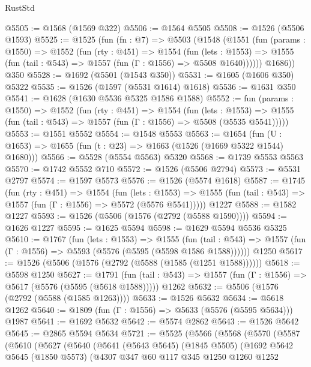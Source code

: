 \begin{lexlean}{RustStd}
\begin{coremodule}
@5505 := @1568 (@1569 @322)
@5506 := @1564 @5505
@5508 := @1526 (@5506 @1593)
@5525 := @1525
    (fun (fn : @7) =>
    @5503
      (@1548
        (@1551
          (fun (params : @1550) =>
          @1552
            (fun (rty : @451) =>
            @1554
              (fun (lets : @1553) =>
              @1555 (fun (tail : @543) => @1557 (fun (Γ : @1556) => @5508 @1640))))))
        @1686))
    @350
@5528 := @1692 (@5501 (@1543 @350))
@5531 := @1605 (@1606 @350) @5322
@5535 := @1526 (@1597 (@5531 @1614) @1618)
@5536 := @1631 @350
@5541 := @1628 (@1630 @5536 @5325 @1586 @1588)
@5552 := fun (params : @1550) =>
  @1552
    (fun (rty : @451) =>
    @1554
      (fun (lets : @1553) =>
      @1555 (fun (tail : @543) => @1557 (fun (Γ : @1556) => @5508 (@5535 @5541)))))
@5553 := @1551 @5552
@5554 := @1548 @5553
@5563 := @1654 (fun (U : @1653) => @1655 (fun (t : @23) => @1663 (@1526 (@1669 @5322 @1544) @1680)))
@5566 := @5528 (@5554 @5563) @5320
@5568 := @1739 @5553 @5563
@5570 := @1742 @5552 @710
@5572 := @1526 (@5506 @2794)
@5573 := @5531 @2797
@5574 := @1597 @5573
@5576 := @1526 (@5574 @1618)
@5587 := @1745
    (fun (rty : @451) =>
    @1554
      (fun (lets : @1553) =>
      @1555 (fun (tail : @543) => @1557 (fun (Γ : @1556) => @5572 (@5576 @5541)))))
    @1227
@5588 := @1582 @1227
@5593 := @1526 (@5506 (@1576 (@2792 (@5588 @1590))))
@5594 := @1626 @1227
@5595 := @1625 @5594
@5598 := @1629 @5594 @5536 @5325
@5610 := @1767
    (fun (lets : @1553) =>
    @1555
      (fun (tail : @543) => @1557 (fun (Γ : @1556) => @5593 (@5576 (@5595 (@5598 @1586 @1588))))))
    @1250
@5617 := @1526 (@5506 (@1576 (@2792 (@5588 (@1585 (@1251 @1588))))))
@5618 := @5598 @1250
@5627 := @1791
    (fun (tail : @543) => @1557 (fun (Γ : @1556) => @5617 (@5576 (@5595 (@5618 @1588)))))
    @1262
@5632 := @5506 (@1576 (@2792 (@5588 (@1585 @1263))))
@5633 := @1526 @5632
@5634 := @5618 @1262
@5640 := @1809 (fun (Γ : @1556) => @5633 (@5576 (@5595 @5634))) @1987
@5641 := @1692 @5632
@5642 := @5574 @2862
@5643 := @1526 @5642
@5645 := @2865 @5594 @5634
@5721 := @5525
    (@5566
      (@5568
        (@5570
          (@5587
            (@5610
              (@5627
                (@5640
                  (@5641
                    (@5643 @5645)
                    (@1845 @5505)
                    (@1692
                      @5642
                      @5645
                      (@1850 @5573)
                      (@4307
                        @347
                        @60
                        @117
                        @345
                        @1250
                        @1260
                        @1252

\end{coremodule}
\end{lexlean}
